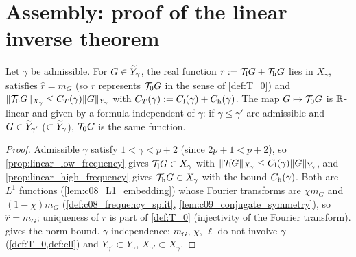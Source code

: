 \section{Assembly: proof of the linear inverse theorem}

\begin{lemma}[Boundedness of $\mc T_0$]
  \label{lem:c09_T0_bounded}
  Let $\gamma$ be admissible. For $G\in\widetilde{Y}_\gamma$, the real function $r:=\mathcal{T}_{\textup{l}}G+\mathcal{T}_{\textup{h}}G$ lies in $X_\gamma$, satisfies $\widehat r=m_G$
  (so $r$ represents $\mathcal{T}_0G$ in the sense of \cref{def:T_0}) and $\|\mathcal{T}_0G\|_{X_\gamma}\le C_T(\gamma)\|G\|_{Y_\gamma}$ with
  $C_T(\gamma):=C_{\textup{l}}(\gamma)+C_{\textup{h}}(\gamma)$. The map $G\mapsto\mathcal{T}_0G$ is $\mathbb{R}$-linear and given by a formula independent of $\gamma$:
  if $\gamma\le\gamma'$ are admissible and $G\in\widetilde{Y}_{\gamma'}$ ($\subset\widetilde{Y}_\gamma$), $\mathcal{T}_0G$ is the same function.
\end{lemma}
\begin{proof}
  Admissible $\gamma$ satisfy $1<\gamma<p+2$ (since $2p+1<p+2$), so \cref{prop:linear_low_frequency} gives $\mathcal{T}_{\textup{l}}G\in X_\gamma$ with
  $\|\mathcal{T}_{\textup{l}}G\|_{X_\gamma}\le C_{\textup{l}}(\gamma)\|G\|_{Y_\gamma}$, and \cref{prop:linear_high_frequency} gives $\mathcal{T}_{\textup{h}}G\in X_\gamma$ with the bound
  $C_{\textup{h}}(\gamma)$. Both are $L^1$ functions (\cref{lem:c08_L1_embedding}) whose Fourier transforms are $\chi m_G$ and $(1-\chi)m_G$
  (\cref{def:c08_frequency_split}, \cref{lem:c09_conjugate_symmetry}), so $\widehat r=m_G$; uniqueness of $r$ is part of \cref{def:T_0}
  (injectivity of the Fourier transform).  gives the norm bound.
  $\gamma$-independence: $m_G$, $\chi$, $\ell$ do not involve $\gamma$ (\cref{def:T_0,def:ell}) and $Y_{\gamma'}\subset Y_\gamma$, $X_{\gamma'}\subset X_\gamma$.
\end{proof}

